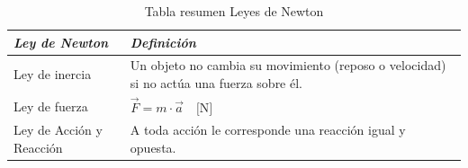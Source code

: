 \documentclass{article}
\begin{document}
\begin{table}[htbp]
	\centering
	\begin{tabular}{|| l | p{8.5cm} ||}
		\hline
		\textbf{\textit{Ley de Newton}} & \textbf{\textit{Definición}}                                                            \\
		\hline
		Ley de inercia                  & Un objeto no cambia su movimiento (reposo o velocidad) si no actúa una fuerza sobre él. \\
		\hline
		Ley de fuerza                   & $\vec{F} =  m \cdot \vec{a} \quad \text{[N]} $                                          \\
		\hline
		Ley de Acción y Reacción        & A toda acción le corresponde una reacción igual y opuesta.                              \\
		\hline
	\end{tabular}
	\caption{Tabla resumen Leyes de Newton \cite{nasa_newton_laws}}
	\label{tab:tabla_resumen}
\end{table}

\newpage

\printbibliography
\end{document}
